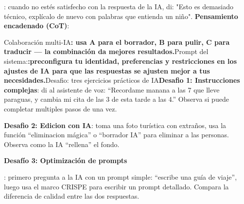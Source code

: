 \begin{tcbinfo}{: cuando no estés satisfecho con la respuesta de la IA, di: "Esto es demasiado técnico, explícalo de nuevo con palabras que entienda un niño".}
\textbf{Pensamiento encadenado (CoT)}:

Colaboración multi-IA\textbf{: usa A para el borrador, B para pulir, C para traducir — la combinación da mejores resultados.}Prompt del sistema:\textbf{:preconfigura tu identidad, preferencias y restricciones en los ajustes de IA para que las respuestas se ajusten mejor a tus necesidades.}Desafio: tres ejercicios prácticos de IA\textbf{Desafio 1: Instrucciones complejas}: di al asistente de voz: “Recordame manana a las 7 que lleve paraguas, y cambia mi cita de las 3 de esta tarde a las 4.” Observa si puede completar multiples pasos de una vez.

\textbf{Desafio 2: Edicion con IA}: toma una foto turística con extraños, usa la función “eliminacion mágica” o “borrador IA” para eliminar a las personas. Observa como la IA “rellena” el fondo.

\end{tcbinfo}

\textbf{Desafío 3: Optimización de prompts}\par

: primero pregunta a la IA con un prompt simple: “escribe una guía de viaje”, luego usa el marco CRISPE para escribir un prompt detallado. Compara la diferencia de calidad entre las dos respuestas.

